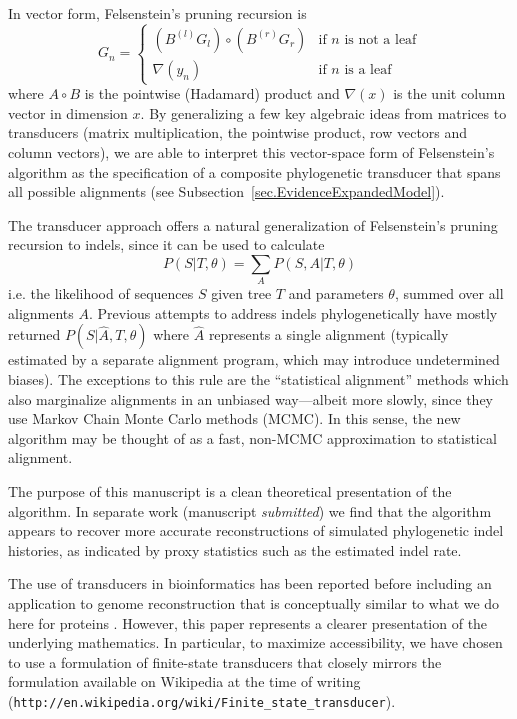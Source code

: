 \documentclass{article}
\newcommand{\secref}[1]{Subsection~\ref{sec.#1}}
\newcommand\fork{\circ}
\newcommand\recognize{\nabla}
\begin{document}
In vector form, Felsenstein's pruning recursion is
\[
G_n = \left\{
\begin{array}{ll}
\left( B^{(l)} G_l \right) \fork \left( B^{(r)} G_r \right) & \mbox{if $n$ is not a leaf} \\
\recognize(y_n) & \mbox{if $n$ is a leaf}
\end{array}
\right.
\]
where $A \fork B$ is the pointwise (Hadamard) product
and $\recognize(x)$ is the unit column vector in dimension $x$.
By generalizing a few key algebraic ideas from matrices to transducers
(matrix multiplication, the pointwise product, row vectors and column vectors),
we are able to interpret this vector-space form of Felsenstein's algorithm
as the specification of a composite phylogenetic transducer
that spans all possible alignments (see \secref{EvidenceExpandedModel}).

The transducer approach offers a natural generalization of Felsenstein's pruning recursion to indels,
since it can be used to calculate
\[
P(S|T,\theta) = \sum_A P(S,A|T,\theta)
\]
i.e. the likelihood of sequences $S$ given tree $T$ and parameters $\theta$, summed over all alignments $A$.
Previous attempts to address indels phylogenetically have mostly returned $P(S|\hat{A},T,\theta)$ where $\hat{A}$ represents a single alignment
(typically estimated by a separate alignment program, which may introduce undetermined biases).
The exceptions to this rule are the ``statistical alignment'' methods \cite{HeinEtal2000,Hein2001,HolmesBruno2001,Metzler2003,SuchardRedelings2006}
which also marginalize alignments in an unbiased way---albeit more slowly, since they use Markov Chain Monte Carlo methods (MCMC).
In this sense, the new algorithm may be thought of as a fast, non-MCMC approximation to statistical alignment.

The purpose of this manuscript is a clean theoretical presentation of the algorithm.
In separate work (manuscript {\em submitted}) we find that the algorithm appears to recover more accurate reconstructions of simulated phylogenetic indel histories,
as indicated by proxy statistics such as the estimated indel rate.

The use of transducers in bioinformatics has been reported before \cite{Holmes2003,BradleyHolmes2007,SatijaEtAl2008,PatenEtAl2008}
including an application to genome reconstruction that is conceptually similar to what we do here for proteins \cite{PatenEtAl2008}.
However, this paper represents a clearer presentation of the underlying mathematics.
In particular, to maximize accessibility, we have chosen to use a formulation of finite-state transducers
that closely mirrors the formulation available on Wikipedia at the time of writing ({\tt http://en.wikipedia.org/wiki/Finite\_state\_transducer}).
\end{document}
